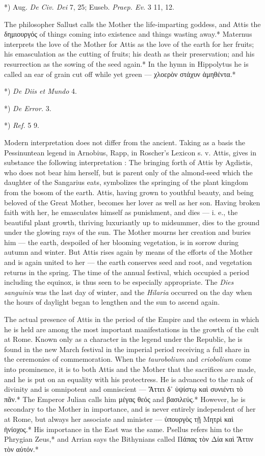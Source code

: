 \documentclass[a4paper, 11pt, oneside, polutonikogreek, english]{article}
\begin{document}
*) Aug. \emph{De Civ. Dei} 7, 25; Euseb. \emph{Praep. Ev.} 3 11, 12.

The philosopher Sallust calls the Mother the life-imparting goddess, and Attis the δημιουργός of things coming into existence and things wasting away.* Maternus interprets the love of the Mother for Attis as the love of the earth for her fruits; his emasculation as the cutting of fruits; his death as their preservation; and his resurrection as the sowing of the seed again.* In the hymn in Hippolytus he is called an ear of grain cut off while yet green --- χλοερὸν στάχυν ἀμηθέντα.*

*) \emph{De Diis et Mundo} 4.

*) \emph{De Error.} 3.

*) \emph{Ref.} 5 9.

Modern interpretation does not differ from the ancient. Taking as a basis the Pessinuntean legend in Arnobius, Rapp, in Roscher's Lexicon s. v. Attis, gives in substance the following interpretation : The bringing forth of Attis by Agdistis, who does not bear him herself, but is parent only of the almond-seed which the daughter of the Sangarius eats, symbolizes the springing of the plant kingdom from the bosom of the earth. Attis, having grown to youthful beauty, and being beloved of the Great Mother, becomes her lover as well as her son. Having broken faith with her, he emasculates himself as punishment, and dies --- i. e., the beautiful plant growth, thriving luxuriantly up to midsummer, dies to the ground under the glowing rays of the sun. The Mother mourns her creation and buries him --- the earth, despoiled of her blooming vegetation, is in sorrow during autumn and winter. But Attis rises again by means of the efforts of the Mother and is again united to her --- the earth conserves seed and root, and vegetation returns in the spring. The time of the annual festival, which occupied a period including the equinox, is thus seen to be especially appropriate. The \emph{Dies sanguinis} was the last day of winter, and the \emph{Hilaria} occurred on the day when the hours of daylight began to lengthen and the sun to ascend again.

The actual presence of Attis in the period of the Empire and the esteem in which he is held are among the most important manifestations in the growth of the cult at Rome. Known only as a character in the legend under the Republic, he is found in the new March festival in the imperial period receiving a full share in the ceremonies of commemoration. When the \emph{taurobolium} and \emph{criobolium} come into prominence, it is to both Attis and the Mother that the sacrifices are made, and he is put on an equality with his protectress. He is advanced to the rank of divinity and is omnipotent and omniscient --- Ἄττει δ᾽ ὑψίστῳ καὶ συνιέντι τὸ πᾶν.* The Emperor Julian calls him μέγας θεός and βασιλεύς.* However, he is secondary to the Mother in importance, and is never entirely independent of her at Rome, but always her associate and minister --- ὑπουργὸς τῇ Μητρὶ καὶ ἡνίοχος.* His importance in the East was the same. Psellus refers him to the Phrygian Zeus,* and Arrian says the Bithynians called Πάπας τὸν Δία καὶ Ἄττιν τὸν αὐτόν.*
\end{document}

